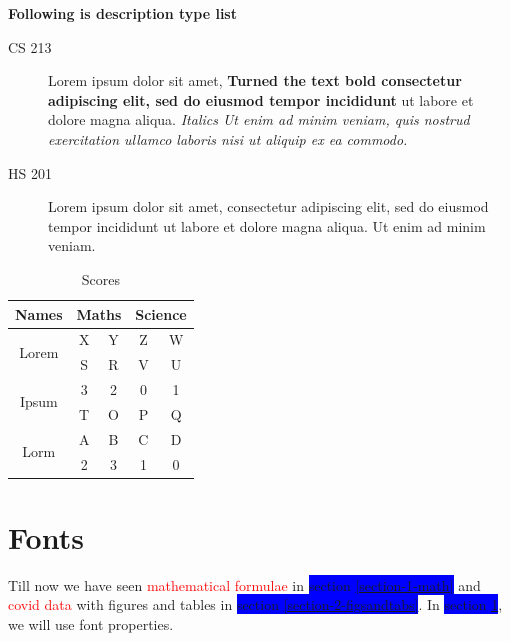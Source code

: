 \documentclass{article}
\begin{document}
\par \textbf{Following is description type list}

\begin{description}
\item[CS 213] Lorem ipsum dolor sit amet, 
\textbf{Turned the text bold consectetur adipiscing elit, sed do eiusmod tempor incididunt} ut labore et dolore magna aliqua.\textit{ Italics Ut enim ad minim veniam, quis nostrud exercitation ullamco laboris nisi ut aliquip ex ea commodo.}
\item[HS 201] Lorem ipsum dolor sit amet, consectetur adipiscing elit, sed do eiusmod tempor incididunt ut labore et dolore magna aliqua. Ut enim ad minim veniam.
\end{description}

\newpage
\pagecolor{green}
\begin{table}
    \centering
    \begin{tabular}{|c|c|c|c|c|}
    \hline
     Names & \multicolumn{2}{|c|}{Maths} & \multicolumn{2}{|c|}{Science} \\
     \hline
     \multirow{2}{1cm}{Lorem} & X & Y & Z & W \\ 
     \cline{2-5} %
     & S & R & V & U \\
     \hline
     \multirow{2}{1cm}{Ipsum} & 3 & 2 & 0 & 1 \\
     \cline{2-5}
     & T & O & P & Q \\
     \hline
     \multirow{2}{1cm}{Lorm} & A & B & C & D \\
     \cline{2-5}
     & 2 & 3 & 1 & 0 \\
     \hline
    \end{tabular}
    \caption{Scores}
    \label{tab:scores}
\end{table}

\section{Fonts}
\label{section-3-fonts}
Till now we have seen \textcolor{red}{mathematical formulae} in \colorbox{blue}{section \ref{section-1-math}} and \textcolor{red}{covid data} with figures and tables in \colorbox{blue}{section \ref{section-2-figsandtabs}}. In \colorbox{blue}{section \ref{section-3-fonts}}, we will use font properties.
\end{document}
